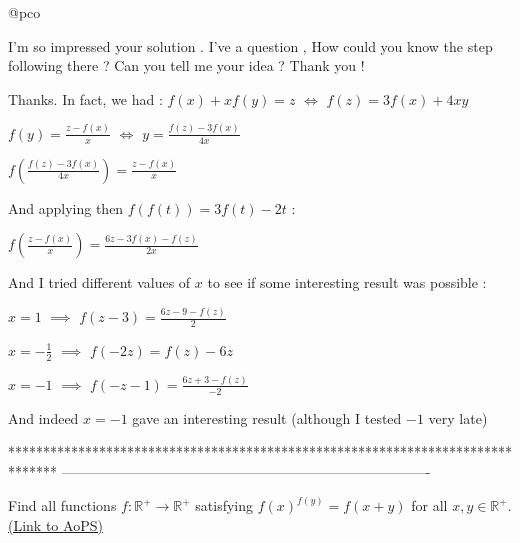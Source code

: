 \begin{solution}
	\begin{tcolorbox}\begin{bolded}@pco\end{bolded} I'm so impressed your solution . I've a question , How could you know the step following there ? Can you tell me your idea ? Thank you !\end{tcolorbox}
Thanks.
In fact, we had :
$f(x)+xf(y)=z$ $\iff$ $f(z)=3f(x)+4xy$

$f(y)=\frac{z-f(x)}x$ $\iff$ $y=\frac{f(z)-3f(x)}{4x}$

$f(\frac{f(z)-3f(x)}{4x})=\frac{z-f(x)}x$

And applying then $f(f(t))=3f(t)-2t$ :

$f(\frac{z-f(x)}x)=\frac{6z-3f(x)-f(z)}{2x}$

And I tried different values of $x$ to see if some interesting result was possible :

$x=1$ $\implies$ $f(z-3)=\frac{6z-9-f(z)}{2}$

$x=-\frac 12$ $\implies$ $f(-2z)=f(z)-6z$

$x=-1$ $\implies$ $f(-z-1)=\frac{6z+3-f(z)}{-2}$

And indeed $x=-1$ gave an interesting result (although I tested $-1$ very late)
\end{solution}
*******************************************************************************
-------------------------------------------------------------------------------

\begin{problem}
	Find all functions $f : \mathbb{R}^+ \rightarrow \mathbb{R}^+$ satisfying $f(x)^{f(y)} = f(x+y)$ for all $x,y \in \mathbb{R}^+$.
	\flushright \href{https://artofproblemsolving.com/community/c6h480075}{(Link to AoPS)}
\end{problem}



